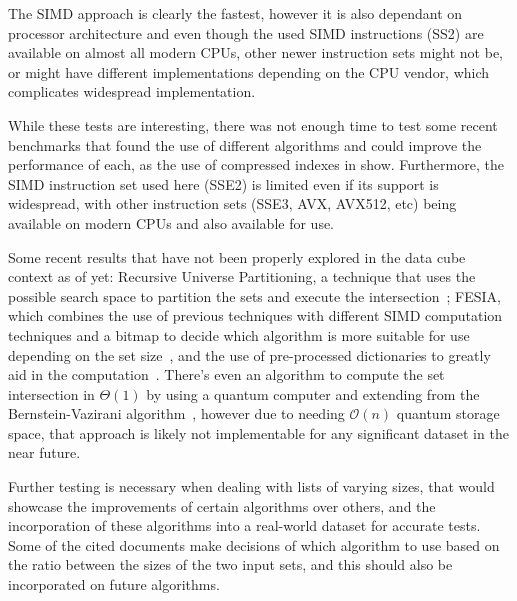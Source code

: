 The SIMD approach is clearly the fastest, however it is also dependant on processor architecture and even though the used SIMD instructions (SS2) are available on almost all modern CPUs, other newer instruction sets might not be, or might have different implementations depending on the CPU vendor, which complicates widespread implementation.

While these tests are interesting, there was not enough time to test some recent benchmarks that found the use of different algorithms and could improve the performance of each, as the use of compressed indexes in  show.
Furthermore, the SIMD instruction set used here (SSE2) is limited even if its support is widespread, with other instruction sets (SSE3, AVX, AVX512, etc) being available on modern CPUs and also available for use.

Some recent results that have not been properly explored in the data cube context as of yet: Recursive Universe Partitioning, a technique that uses the possible search space to partition the sets and execute the intersection~\cite{pibiriFastCompactSet2021}; FESIA, which combines the use of previous techniques with different SIMD computation techniques and a bitmap to decide which algorithm is more suitable for use depending on the set size~\cite{zhangFESIAFastSIMDEfficient2020}, and the use of pre-processed dictionaries to greatly aid in the computation~\cite{dingFastSetIntersection2011a}.
There's even an algorithm to compute the set intersection in $\Theta(1)$ by using a quantum computer and extending from the Bernstein-Vazirani algorithm~\cite{tianQuantumAlgorithmFinding2019}, however due to needing $\mathcal{O}(n)$ quantum storage space, that approach is likely not implementable for any significant dataset in the near future.

Further testing is necessary when dealing with lists of varying sizes, that would showcase the improvements of certain algorithms over others, and the incorporation of these algorithms into a real-world dataset for accurate tests.
Some of the cited documents make decisions of which algorithm to use based on the ratio between the sizes of the two input sets, and this should also be incorporated on future algorithms.


